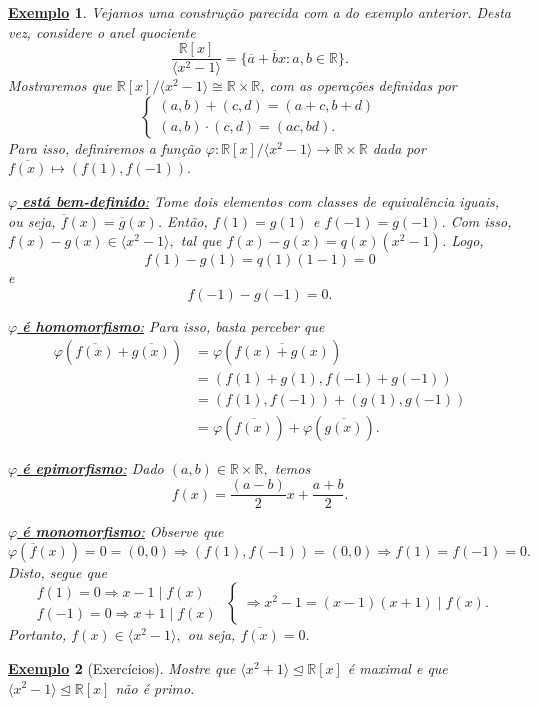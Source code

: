 \documentclass{article}
\newtheorem{example}{\underline{Exemplo}}
\begin{document}
\begin{example}
  Vejamos uma construção parecida com a do exemplo anterior. Desta vez, considere o anel quociente 
  \[
    \frac{\mathbb{R}[x]}{\langle x^{2}-1 \rangle} = \{\overline{a}+\overline{b}x:a, b\in \mathbb{R}\}.
  \]
  Mostraremos que \(\mathbb{R}[x]/\langle x^{2}-1 \rangle\cong{\mathbb{R}\times \mathbb{R}}\), com as operações definidas por
  \[
    \left\{\begin{array}{ll}
        (a, b) + (c, d) = (a + c, b + d)\\
        (a, b) \cdot (c, d) = (ac, bd).
    \end{array}\right.
  \]
  Para isso, definiremos a função \(\varphi :\mathbb{R}[x]/\langle x^{2}-1 \rangle\rightarrow \mathbb{R}\times \mathbb{R}\) dada por \(\overline{f(x)}\mapsto (f(1), f(-1)).\)

  \underline{ \(\varphi \)\textbf{ está bem-definido}:} Tome dois elementos com classes de equivalência iguais, ou seja,
  \(\overline{f}(x) = \overline{g}(x)\). Então, \(f(1) = g(1) \) e \(f(-1) = g(-1)\). Com isso,
  \(f(x) - g(x)\in \langle x^{2} - 1 \rangle,\) tal que \(f(x) - g(x) = q(x)(x^{2}-1)\). Logo, 
  \[
    f(1) - g(1) = q(1)(1-1) = 0
  \]
  e 
  \[
    f(-1)-g(-1) = 0.
  \]

  \underline{\(\varphi\) \textbf{ é homomorfismo}:} Para isso, basta perceber que 
  \begin{align*}
    \varphi (\overline{f(x)} + \overline{g(x)}) &= \varphi (\overline{f(x)+g(x)}) \\
                                                &= (f(1) + g(1), f(-1)+g(-1))\\
                                                &= (f(1), f(-1)) + (g(1), g(-1))\\
                                                &= \varphi (\overline{f(x)}) + \varphi (\overline{g(x)}).
  \end{align*}

  \underline{\(\varphi \)\textbf{ é epimorfismo}:} Dado \((a, b)\in \mathbb{R}\times \mathbb{R},\) temos 
  \[
    f(x) = \frac{(a-b)}{2}x + \frac{a+b}{2}. 
  \]

  \underline{\(\varphi \)\textbf{ é monomorfismo}:} Observe que 
  \[
    \varphi (\overline{f}(x)) = 0 = (0, 0) \Rightarrow (f(1), f(-1)) = (0, 0) \Rightarrow f(1) = f(-1) = 0.
  \]
  Disto, segue que 
  \[
    \left.\begin{array}{ll}
        f(1) = 0 \Rightarrow x-1\mid f(x)\\
        f(-1) = 0 \Rightarrow x+1\mid f(x)
      \end{array}\right\{ \Rightarrow x^{2}-1 = (x-1)(x+1)\mid f(x).
      \]
      Portanto, \(f(x)\in \langle x^{2}-1 \rangle,\) ou seja, \(\overline{f(x)} = 0.\)
    \end{example}
    \begin{example}[Exercícios]
      Mostre que \(\langle x^{2} + 1 \rangle \trianglelefteq \mathbb{R}[x]\) é maximal e que \(\langle x^{2}-1 \rangle \trianglelefteq \mathbb{R}[x]\) não é primo. 
    \end{example}
\end{document}
